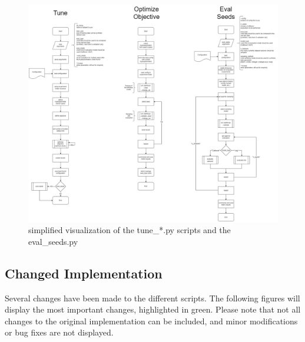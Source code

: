 \begin{landscape}
\begin{figure}
	\centering
	\includegraphics[height=\textheight,width=\linewidth,keepaspectratio]{images/tune_eval_seeds-ORIGINAL.png}
	\caption[Tuning Script]{simplified visualization of the tune\_*.py scripts and the eval\_seeds.py}
\end{figure}
\end{landscape}

\subsection[]{Changed Implementation}
Several changes have been made to the different scripts.
The following figures will display the most important changes, highlighted in green.
Please note that not all changes to the original implementation can be included, and minor modifications or bug fixes are not displayed.

